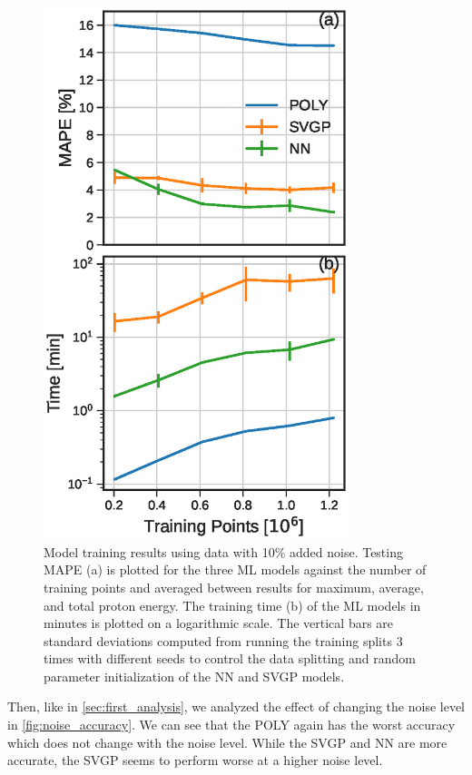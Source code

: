 \begin{figure}
	\centering
	\includegraphics[width=3.5in]{planning/images/paper2/fig4.eps}
	\caption{Model training results using data with 10\% added noise. Testing MAPE (a) is plotted for the three ML models against the number of training points and averaged between results for maximum, average, and total proton energy. The training time (b) of the ML models in minutes is plotted on a logarithmic scale. The vertical bars are standard deviations computed from running the training splits 3 times with different seeds to control the data splitting and random parameter initialization of the NN and SVGP models.}
	\label{fig:train_time_accuracy}
\end{figure}

Then, like in \autoref{sec:first_analysis}, we analyzed the effect of changing the noise level in \autoref{fig:noise_accuracy}. We can see that the \gls{POLY} again has the worst accuracy which does not change with the noise level. While the \gls{SVGP} and \gls{NN} are more accurate, the \gls{SVGP} seems to perform worse at a higher noise level.

